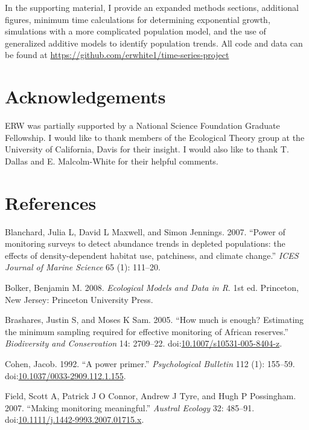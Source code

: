 \documentclass[12pt,]{article}
\begin{document}
\begin{spacing}{2}
In the supporting material, I provide an expanded methods sections,
additional figures, minimum time calculations for determining
exponential growth, simulations with a more complicated population
model, and the use of generalized additive models to identify population
trends. All code and data can be found at
\url{https://github.com/erwhite1/time-series-project}

\section{Acknowledgements}\label{acknowledgements}

ERW was partially supported by a National Science Foundation Graduate
Fellowship. I would like to thank members of the Ecological Theory group
at the University of California, Davis for their insight. I would also
like to thank T. Dallas and E. Malcolm-White for their helpful comments.

\section{References}\label{references}

\hypertarget{refs}{}
\hypertarget{ref-Blanchard2007}{}
Blanchard, Julia L, David L Maxwell, and Simon Jennings. 2007. ``Power
of monitoring surveys to detect abundance trends in depleted
populations: the effects of density-dependent habitat use, patchiness,
and climate change.'' \emph{ICES Journal of Marine Science} 65 (1):
111--20.

\hypertarget{ref-Bolker2008}{}
Bolker, Benjamin M. 2008. \emph{Ecological Models and Data in R}. 1st
ed. Princeton, New Jersey: Princeton University Press.

\hypertarget{ref-Brashares2005}{}
Brashares, Justin S, and Moses K Sam. 2005. ``How much is enough?
Estimating the minimum sampling required for effective monitoring of
African reserves.'' \emph{Biodiversity and Conservation} 14: 2709--22.
doi:\href{https://doi.org/10.1007/s10531-005-8404-z}{10.1007/s10531-005-8404-z}.

\hypertarget{ref-Cohen1992}{}
Cohen, Jacob. 1992. ``A power primer.'' \emph{Psychological Bulletin}
112 (1): 155--59.
doi:\href{https://doi.org/10.1037/0033-2909.112.1.155}{10.1037/0033-2909.112.1.155}.

\hypertarget{ref-Field2007}{}
Field, Scott A, Patrick J O Connor, Andrew J Tyre, and Hugh P
Possingham. 2007. ``Making monitoring meaningful.'' \emph{Austral
Ecology} 32: 485--91.
doi:\href{https://doi.org/10.1111/j.1442-9993.2007.01715.x}{10.1111/j.1442-9993.2007.01715.x}.


\end{spacing}
\end{document}
